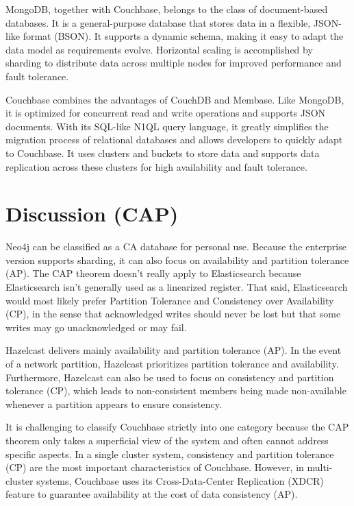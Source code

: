 MongoDB, together with Couchbase, belongs to the class of document-based databases. It is a general-purpose database that stores data in a flexible, JSON-like format (BSON). It supports a dynamic schema, making it easy to adapt the data model as requirements evolve. Horizontal scaling is accomplished by sharding to distribute data across multiple nodes for improved performance and fault tolerance.

Couchbase combines the advantages of CouchDB and Membase. Like MongoDB, it is optimized for concurrent read and write operations and supports JSON documents. With its SQL-like N1QL query language, it greatly simplifies the migration process of relational databases and allows developers to quickly adapt to Couchbase. It uses clusters and buckets to store data and supports data replication across these clusters for high availability and fault tolerance.

\section*{Discussion (CAP)}

Neo4j can be classified as a \ac{CA} database for personal use. Because the enterprise version supports sharding, it can also focus on availability and partition tolerance (AP).
The CAP theorem doesn’t really apply to Elasticsearch because Elasticsearch isn't generally used as a linearized register. That said, Elasticsearch would most likely prefer Partition Tolerance and Consistency over Availability (\ac{CP}), in the sense that acknowledged writes should never be lost but that some writes may go unacknowledged or may fail.

Hazelcast delivers mainly availability and partition tolerance (\ac{AP}). In the event of a network partition, Hazelcast prioritizes partition tolerance and availability. Furthermore, Hazelcast can also be used to focus on consistency and partition tolerance (\ac{CP}), which leads to non-consistent members being made non-available whenever a partition appears to ensure consistency.

It is challenging to classify Couchbase strictly into one category because the CAP theorem only takes a superficial view of the system and often cannot address specific aspects. In a single cluster system, consistency and partition tolerance (CP) are the most important characteristics of Couchbase. However, in multi-cluster systems, Couchbase uses its Cross-Data-Center Replication (XDCR) feature to guarantee availability at the cost of data consistency (\ac{AP}).


